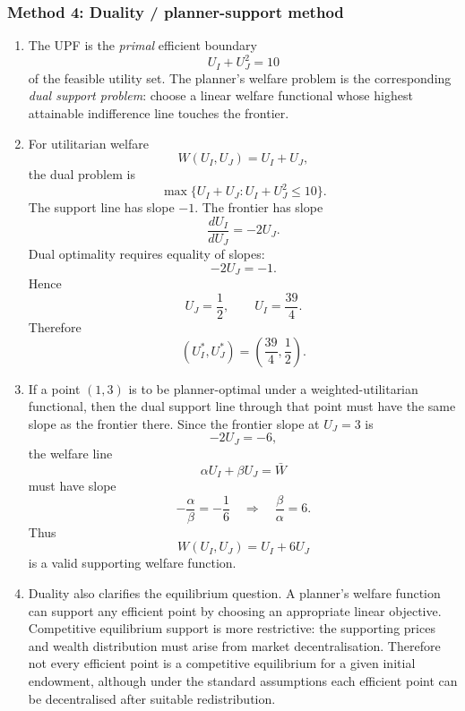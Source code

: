 \documentclass[12pt]{article}
\begin{document}
\newpage
\subsubsection{Method 4: Duality / planner-support method}

\begin{enumerate}[label=(\alph*)]
    \item
    The UPF is the \emph{primal} efficient boundary
    \[
    U_I+U_J^2=10
    \]
    of the feasible utility set. The planner's welfare problem is the corresponding \emph{dual support problem}: choose a linear welfare functional whose highest attainable indifference line touches the frontier.

    \item
    For utilitarian welfare
    \[
    W(U_I,U_J)=U_I+U_J,
    \]
    the dual problem is
    \[
    \max\{U_I+U_J: U_I+U_J^2\le 10\}.
    \]
    The support line has slope \(-1\). The frontier has slope
    \[
    \frac{dU_I}{dU_J}=-2U_J.
    \]
    Dual optimality requires equality of slopes:
    \[
    -2U_J=-1.
    \]
    Hence
    \[
    U_J=\frac12,\qquad U_I=\frac{39}{4}.
    \]
    Therefore
    \[
    \boxed{\left(U_I^*,U_J^*\right)=\left(\frac{39}{4},\frac12\right).}
    \]

    \item
    If a point \((1,3)\) is to be planner-optimal under a weighted-utilitarian functional, then the dual support line through that point must have the same slope as the frontier there. Since the frontier slope at \(U_J=3\) is
    \[
    -2U_J=-6,
    \]
    the welfare line
    \[
    \alpha U_I+\beta U_J=\bar W
    \]
    must have slope
    \[
    -\frac{\alpha}{\beta}=-\frac16
    \quad\Longrightarrow\quad
    \frac{\beta}{\alpha}=6.
    \]
    Thus
    \[
    \boxed{W(U_I,U_J)=U_I+6U_J}
    \]
    is a valid supporting welfare function.

    \item
    Duality also clarifies the equilibrium question. A planner's welfare function can support any efficient point by choosing an appropriate linear objective. Competitive equilibrium support is more restrictive: the supporting prices and wealth distribution must arise from market decentralisation. Therefore not every efficient point is a competitive equilibrium for a given initial endowment, although under the standard assumptions each efficient point can be decentralised after suitable redistribution.
\end{enumerate}
\end{document}
